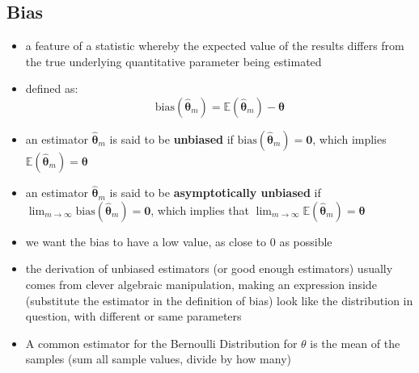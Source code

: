 \documentclass[11pt, twocolumn]{report}
\def\expectation{\mathbb{E}}
\def\statistic{\hat{\bm{\theta}}}
\def\parameter{\bm{\theta}}
\begin{document}
\subsection{Bias}
\begin{itemize}
  \item a feature of a statistic whereby the expected value of the results
    differs from the true underlying quantitative parameter being estimated
  \item defined as:
    \begin{equation}
      \text{bias}(\statistic_m) = \expectation{(\statistic_m)} - \parameter
    \end{equation}
  \item an estimator $\statistic_m$ is said to be \textbf{unbiased} if
    $\text{bias}(\statistic_m) = \bm{0}$, which implies
    $\expectation{(\statistic_m)} = \parameter$
  \item an estimator $\statistic_m$ is said to be \textbf{asymptotically
      unbiased} if $\lim_{m \to \infty} \text{bias}(\statistic_m) = \bm{0}$,
    which implies that $\lim_{m \to \infty} \expectation{(\statistic_m)} =
    \parameter$
  \item we want the bias to have a low value, as close to 0 as possible
  \item the derivation of unbiased estimators (or good enough estimators)
    usually comes from clever algebraic manipulation, making an expression
    inside (substitute the estimator in the definition of bias) look like the
    distribution in question, with different or same parameters
  \item A common estimator for the Bernoulli Distribution for $\theta$ is the
    mean of the samples (sum all sample values, divide by how many)
\end{itemize}
\end{document}
